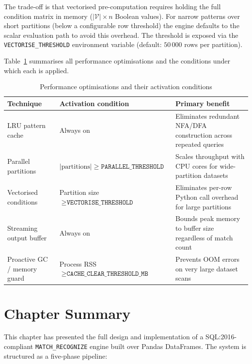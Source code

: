 The trade-off is that vectorised pre-computation requires holding
the full condition matrix in memory ($|\mathcal{V}| \times n$
Boolean values).  For narrow patterns over short partitions
(below a configurable row threshold) the engine defaults to the
scalar evaluation path to avoid this overhead.  The threshold
is exposed via the \texttt{VECTORISE\_THRESHOLD} environment
variable (default: $50\,000$ rows per partition).

Table~\ref{tab:perf-summary} summarises all performance
optimisations and the conditions under which each is applied.

\begin{table}[htbp]
  \centering
  \caption{Performance optimisations and their activation
    conditions}
  \label{tab:perf-summary}
  \begin{tabular}{p{3.8cm}p{4.2cm}p{4.4cm}}
    \toprule
    \textbf{Technique} & \textbf{Activation condition}
      & \textbf{Primary benefit} \\
    \midrule
    LRU pattern cache
      & Always on
      & Eliminates redundant NFA/DFA construction across repeated
        queries \\[4pt]
    Parallel partitions
      & $|\text{partitions}| \geq \texttt{PARALLEL\_THRESHOLD}$
      & Scales throughput with CPU cores for wide-partition
        datasets \\[4pt]
    Vectorised conditions
      & Partition size $\geq \texttt{VECTORISE\_THRESHOLD}$
      & Eliminates per-row Python call overhead for large
        partitions \\[4pt]
    Streaming output buffer
      & Always on
      & Bounds peak memory to buffer size regardless of match
        count \\[4pt]
    Proactive GC / memory guard
      & Process RSS $\geq \texttt{CACHE\_CLEAR\_THRESHOLD\_MB}$
      & Prevents OOM errors on very large dataset scans \\
    \bottomrule
  \end{tabular}
\end{table}

\section{Chapter Summary}
\label{sec:meth-summary}

This chapter has presented the full design and implementation of a
SQL:2016-compliant \texttt{MATCH\_RECOGNIZE} engine built over
Pandas DataFrames.  The system is structured as a five-phase
pipeline:


